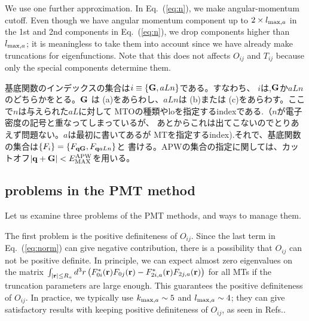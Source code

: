 \documentclass[a4paper,10pt,aip,onecolumn,amsmath,amssymb,floatfix,rmp]{revtex4-1}
\newcommand{\bfq}{{\bf q}}
\newcommand{\bfr}{{\bf r}}
\newcommand{\bfG}{{\bf G}}
\newcommand{\req}[1]{\mbox{Eq.~\!(\ref{#1})}}
\def\EMAX{  E^{\rm APW}_{\rm MAX} }
\def\EMAX{  E^{\rm APW}_{\rm MAX} }
\def\intaa{\int_{|\bfr|\leq R_a}}
\begin{document}
\begin{widetext}
We use one further approximation. In \req{eq:n}, we make angular-momentum cutoff.
Even though we have angular momentum component up to 
$2\times l_{{\rm max},a}$ in the 1st and 2nd components in \req{eq:n}, 
we drop components higher than $l_{{\rm max},a}$; 
it is meaningless to take them into account since we have already make 
truncations for eigenfunctions. Note that this does not affects $O_{ij}$
and $T_{ij}$ because only the special components determine them.

基底関数のインデックスの集合は$i\equiv\{\bfG,aLn\}$である。すなわち、
$i$は,$\bfG$か$aLn$のどちらかをとる。$\bfG$ は (a)をあらわし、$aLn$は (b)または
(c)をあらわす。ここで$n$は与えられた$aL$に対して
MTOの種類やloを指定するindexである.（$n$が電子密度の記号と重なってしまっているが、
あとからこれは出てこないのでとりあえず問題ない。$a$は最初に書いてあるが
MTを指定するindex).それで、基底関数の集合は$\{F_i\}=\{F_{\bfq \bfG},F_{\bfq aLn}\}$と
書ける。APWの集合の指定に関しては、カットオフ$|\bfq+\bfG|<\EMAX$を用いる。

\subsection{problems in the PMT method}
\label{sec:problems}
Let us examine three problems of the PMT methods, and ways to
manage them.

The first problem is the positive definiteness of $O_{ij}$.
Since the last term in \req{eq:norm} can give negative contribution,
there is a possibility that $O_{ij}$ can not be positive definite.
In principle, we can expect almost zero eigenvalues on the matrix
$\intaa d^3r \left(F^*_{0i}(\bfr)F_{0j}(\bfr)-F^*_{2i,a}(\bfr)F_{2j,a}(\bfr)\right)$ 
for all MTs if the truncation parameters are large enough. 
This guarantees the positive definiteness of $O_{ij}$.
In practice, we typically use $k_{{\rm max},a} \sim 5$ 
and $l_{{\rm max},a}\sim 4$; they
can give satisfactory results with keeping positive
definiteness of $O_{ij}$, as seen in Refs.\cite{pmt1,kotanimol2011}.


\end{widetext}
\end{document}
